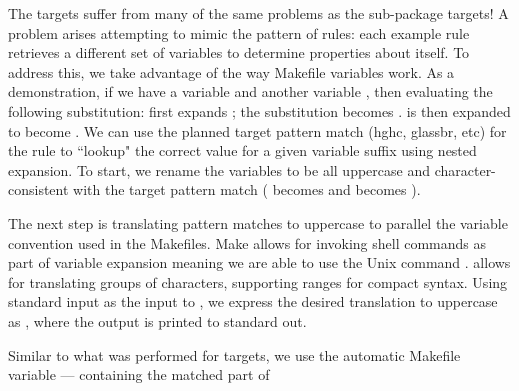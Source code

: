 {{The  targets suffer from many of the same problems as the sub-package  targets! A problem arises attempting to mimic the pattern of  rules: each example rule retrieves a different set of variables to determine properties about itself. To address this, we take advantage of the way Makefile variables work. As a demonstration, if we have a variable \linebreak{} and another variable , then evaluating the following substitution:  first expands ; the substitution becomes \linebreak{}.  is then expanded to become . We can use the planned target pattern match (hghc, glassbr, etc) for the  rule to ``lookup" the correct value for a given variable suffix using nested expansion. To start, we rename the variables to be all uppercase and character-consistent with the target pattern match ( becomes  and  becomes ). %

% 

The next step is translating pattern matches to uppercase to parallel the variable convention used in the Makefiles. Make allows for invoking shell commands as part of variable expansion meaning we are able to use the Unix command .  allows for translating groups of characters, supporting ranges for compact syntax. Using standard input as the input to , we express the desired translation to uppercase as , where the output is printed to standard out. 

Similar to what was performed for  targets, we use the automatic Makefile variable \bash{$*} --- containing the matched part of \bash{%

}}}
